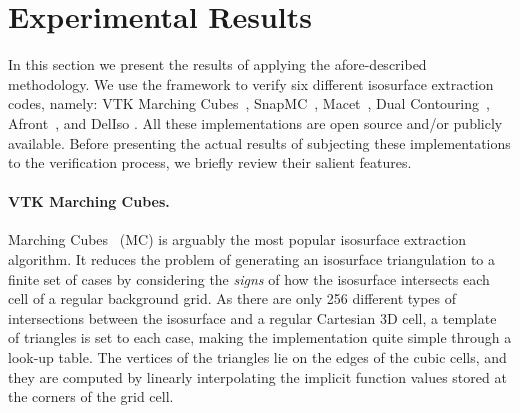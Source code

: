 \section{Experimental Results}
\label{chap1:sec:res}


In this section we present the results of applying the afore-described 
methodology. We use the framework to verify six different isosurface 
extraction codes, namely: VTK Marching Cubes~\cite{lor87},
SnapMC~\cite{Raman:2008:QIM}, Macet~\cite{Dietrich:TVCG:2008},
Dual Contouring~\cite{Ju:2002:DCH:566654.566586}, Afront~\cite{Schreiner06},
and DelIso \cite{Dey07}. All these
implementations are open source and/or publicly 
available. Before presenting the actual results of subjecting these
implementations to the verification process,
we briefly review their salient features.



\paragraph*{VTK Marching Cubes.} Marching Cubes~\cite{lor87} (MC) is
arguably the most popular isosurface extraction algorithm.
It reduces the problem of generating an isosurface triangulation
to a finite set of cases by considering the \emph{signs} of 
how the isosurface intersects each cell of a regular background grid.
As there are only 256 different
types of intersections between the isosurface and a regular Cartesian 3D cell, 
a template of triangles is set to each case, making the implementation quite simple 
through a look-up table. The vertices of the triangles lie on 
the edges of the cubic cells, and they are computed by linearly interpolating 
the implicit function values stored at the corners of the grid cell. 


